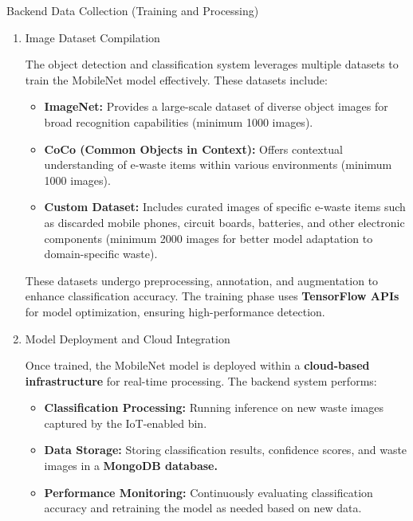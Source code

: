 \newline \noindent Backend Data Collection (Training and Processing)
\begin{enumerate}
	\item Image Dataset Compilation \par
The object detection and classification system leverages multiple datasets to train the MobileNet model effectively. These datasets include: 
	\begin{itemize}
		\item \textbf{ImageNet:} Provides a large-scale dataset of diverse object images for broad recognition capabilities (minimum 1000 images).
		\item \textbf{CoCo (Common Objects in Context):} Offers contextual understanding of e-waste items within various environments (minimum 1000 images).
		\item \textbf{Custom Dataset:} Includes curated images of specific e-waste items such as discarded mobile phones, circuit boards, batteries, and other electronic components (minimum 2000 images for better model adaptation to domain-specific waste).
	\end{itemize} 

These datasets undergo preprocessing, annotation, and augmentation to enhance classification accuracy. The training phase uses \textbf{TensorFlow APIs} for model optimization, ensuring high-performance detection. \newline
	
	\item Model Deployment and Cloud Integration 
	
	Once trained, the MobileNet model is deployed within a \textbf{cloud-based infrastructure} for real-time processing. The backend system performs:
	
	\begin{itemize}
		\item \textbf{Classification Processing:} Running inference on new waste images captured by the IoT-enabled bin.
		\item \textbf{Data Storage:} Storing classification results, confidence scores, and waste images in a \textbf{MongoDB database.}
		\item \textbf{Performance Monitoring:} Continuously evaluating classification accuracy and retraining the model as needed based on new data.
	\end{itemize}
\end{enumerate}

